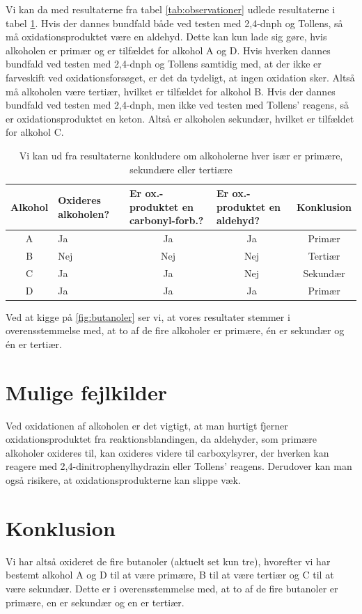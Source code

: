 \documentclass{report}
\begin{document}
Vi kan da med resultaterne fra tabel \ref{tab:observationer} udlede resultaterne i tabel \ref{tab:kon}.
Hvis der dannes bundfald både ved testen med 2,4-dnph og Tollens, så må oxidationsproduktet være en aldehyd.
Dette kan kun lade sig gøre, hvis alkoholen er primær og er tilfældet for alkohol A og D.
Hvis hverken dannes bundfald ved testen med 2,4-dnph og Tollens samtidig med, at der ikke er farveskift ved oxidationsforsøget, er det da tydeligt, at ingen oxidation sker.
Altså må alkoholen være tertiær, hvilket er tilfældet for alkohol B.
Hvis der dannes bundfald ved testen med 2,4-dnph, men ikke ved testen med Tollens' reagens, så er oxidationsproduktet en keton.
Altså er alkoholen sekundær, hvilket er tilfældet for alkohol C.
\begin{table}[H]
\centering
\begin{tabular}{@{}clccc@{}}
\toprule
\multicolumn{1}{l}{Alkohol} & Oxideres alkoholen? & \multicolumn{1}{l}{Er ox.-produktet en carbonyl-forb.?} & \multicolumn{1}{l}{Er ox.-produktet en aldehyd?} & \multicolumn{1}{l}{Konklusion} \\ \midrule
A                           & Ja                  & Ja                                                            & Ja                                               & Primær                                    \\
B                           & Nej                 & Nej                                                           & Nej                                              & Tertiær                                   \\
C                           & Ja                  & Ja                                                            & Nej                                              & Sekundær                                  \\
D                           & Ja                  & Ja                                                            & Ja                                               & Primær                                    \\ \bottomrule
\end{tabular}
\caption{Vi kan ud fra resultaterne konkludere om alkoholerne hver især er primære, sekundære eller tertiære}
\label{tab:kon}
\end{table}
Ved at kigge på \cref{fig:butanoler} ser vi, at vores resultater stemmer i overensstemmelse med, at to af de fire alkoholer er primære, én er sekundær og én er tertiær.

\section*{Mulige fejlkilder}
Ved oxidationen af alkoholen er det vigtigt, at man hurtigt fjerner oxidationsproduktet fra reaktionsblandingen, da aldehyder, som primære alkoholer oxideres til, kan oxideres videre til carboxylsyrer, der hverken kan reagere med 2,4-dinitrophenylhydrazin eller Tollens' reagens.
Derudover kan man også risikere, at oxidationsprodukterne kan slippe væk.

\section*{Konklusion}
Vi har altså oxideret de fire butanoler (aktuelt set kun tre), hvorefter vi har bestemt alkohol A og D til at være primære, B til at være tertiær og C til at være sekundær.
Dette er i overensstemmelse med, at to af de fire butanoler er primære, en er sekundær og en er tertiær.
\end{document}
